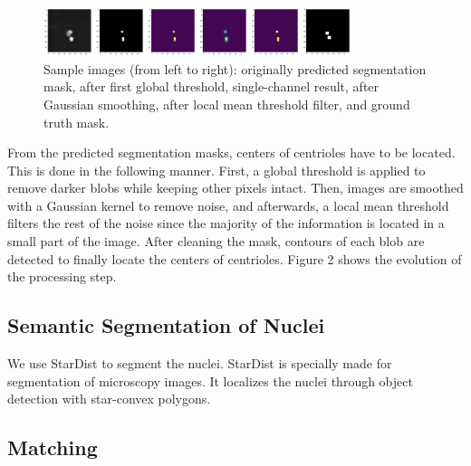 \documentclass[9pt,conference,compsocconf, article]{IEEEtran}
\begin{document}
\begin{figure}[h!]
    \centering
    \includegraphics[width=90mm,scale=1]{images/mask_transformations.png}
    \caption{
    Sample images (from left to right): originally predicted segmentation mask, after first global threshold, single-channel result, after Gaussian smoothing, after local mean threshold filter, and ground truth mask.
    }
    \label{fig:transformations}
\end{figure}


From the predicted segmentation masks, centers of centrioles have to be located. This is done in the following manner. First, a global threshold is applied to remove darker blobs while keeping other pixels intact. Then, images are smoothed with a Gaussian kernel to remove noise, and afterwards, a local mean threshold filters the rest of the noise since the majority of the information is located in a small part of the image. After cleaning the mask, contours of each blob are detected to finally locate the centers of centrioles. Figure 2 shows the evolution of the processing step.




\subsection{Semantic Segmentation of Nuclei}
\label{nuclei-segmentation}
We use StarDist \cite{schmidt2018} to segment the nuclei. StarDist is specially made for segmentation of microscopy images. It localizes the nuclei through object detection with star-convex polygons.



\subsection{Matching}
\label{matching}
\end{document}
